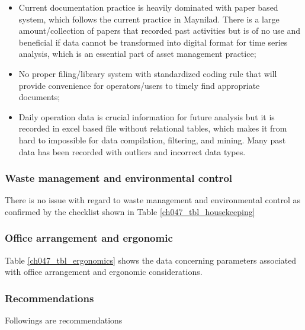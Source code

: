 \begin{itemize}
	\item Current documentation practice is heavily dominated with paper based system, which follows the current practice in Maynilad. There is a large amount/collection of papers that recorded past activities but is of no use and beneficial if data cannot be transformed into digital format for time series analysis, which is an essential part of asset management practice;
	
	\item No proper filing/library system with standardized coding rule that will provide convenience for operators/users to timely find appropriate documents;
	
	\item Daily operation data is crucial information for future analysis but it is recorded in excel based file without relational tables, which makes it from hard to impossible for data compilation, filtering, and mining. Many past data has been recorded with outliers and incorrect data types. 
	
\end{itemize}

\subsubsection{Waste management and environmental control}
There is no issue with regard to waste management and environmental control as confirmed by the checklist shown in Table \ref{ch047_tbl_housekeeping}




\subsubsection{Office arrangement and ergonomic}
Table \ref{ch047_tbl_ergonomics} shows the data concerning parameters associated with office arrangement and ergonomic considerations.




%

\subsubsection{Recommendations}
Followings are recommendations


